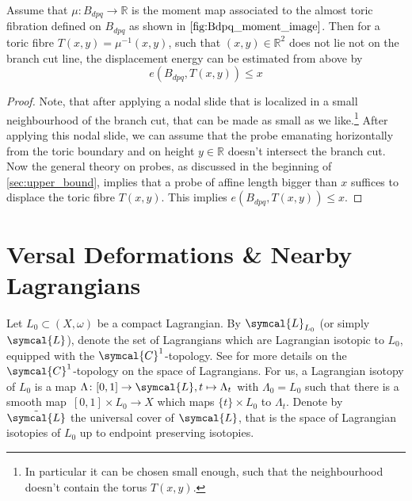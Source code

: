 \documentclass[12pt,a4paper,draft]{scrartcl}
\begin{document}
\begin{lemma}
    \label{thm:upper_bound}
    Assume that $\mu: B_{dpq} \to \mathbb{R}$ is the moment map associated to the almost toric fibration defined on $B_{dpq}$ as shown in $\cref{fig:Bdpq_moment_image}$. 
    Then for a toric fibre $T(x,y)=\mu^{-1}(x,y)$, such that $(x,y) \in \mathbb{R}^2$ does not lie not on the branch cut line, the displacement energy can be estimated from above by
    \[ e(B_{dpq},T(x,y))\leq x \]
\end{lemma}

\begin{proof}
  Note, that after applying a nodal slide that is localized in a small neighbourhood of the branch cut, that can be made as small as we like.\footnote{In particular it can be chosen small enough, such that the neighbourhood doesn't contain the torus $T(x,y)$.} After applying this nodal slide, we can assume that the probe emanating horizontally from the toric boundary and on height $y \in \mathbb{R}$ doesn't intersect the branch cut. Now the general theory on probes, as discussed in the beginning of \cref{sec:upper_bound}, implies that a probe of affine length bigger than $x$ suffices to displace the toric fibre $T(x,y)$. This implies $e(B_{dpq},T(x,y))\leq x$. 
\end{proof}

\section{Versal Deformations \& Nearby Lagrangians}

Let $L_0 ⊂ (X,ω)$ be a compact Lagrangian. By $\symcal{L}_{L_0}$ (or simply $\symcal{L}$), denote the set of Lagrangians which are Lagrangian isotopic to $L_0$, equipped with the $\symcal{C}^1$-topology. See \cite{ono2008LagrangianFlux} for more details on the $\symcal{C}^1$-topology on the space of Lagrangians. For us, a Lagrangian isotopy of $L_0$ is a map $\Lambda \colon [0,1] \rightarrow \symcal{L}, t \mapsto \Lambda_t$ with $\Lambda_0 = L_0$ such that there is a smooth map~$[0,1] \times L_0 \rightarrow X$ which maps $\{t\} \times L_0$ to $\Lambda_t$.  
Denote by $\tilde{\symcal{L}}$ the universal cover of $\symcal{L}$, that is the space of Lagrangian isotopies of $L_0$ up to endpoint preserving isotopies.
\end{document}
